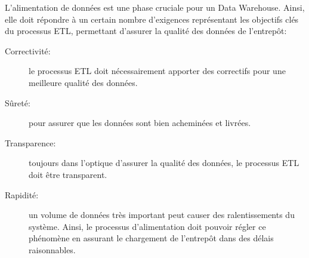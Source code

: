 \documentclass[12pt,a4wide,twoside]{report}
\begin{document}
L'alimentation de données est une phase cruciale pour un Data Warehouse. Ainsi, elle doit répondre à un certain nombre d'exigences représentant les objectifs clés du processus ETL, permettant d'assurer la qualité des données de l'entrepôt:
\begin{description}
	\item[Correctivité: ]le processus ETL doit nécessairement apporter des correctifs pour une meilleure qualité des données.
	\item[Sûreté: ]pour assurer que les données sont bien acheminées et livrées.
	\item[Transparence: ]toujours dans l'optique d'assurer la qualité des données, le processus ETL doit être transparent.
	\item[Rapidité: ]un volume de données très important peut causer des ralentissements du système. Ainsi, le processus d'alimentation doit pouvoir régler ce phénomène en assurant le chargement de l'entrepôt dans des délais raisonnables.
\end{description}
\end{document}
